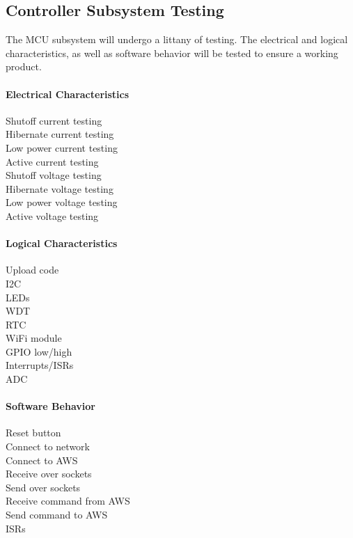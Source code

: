 \subsection{Controller Subsystem Testing}
\label{sec:controller_subsystem_testing}
The MCU subsystem will undergo a littany of testing. The electrical and
logical characteristics, as well as software behavior will be tested to ensure
a working product.

\paragraph{Electrical Characteristics}
Shutoff current testing \\
Hibernate current testing \\
Low power current testing \\
Active current testing \\
Shutoff voltage testing \\
Hibernate voltage testing \\
Low power voltage testing \\
Active voltage testing \\

\paragraph{Logical Characteristics}
Upload code \\
I2C \\
LEDs \\
WDT \\
RTC \\
WiFi module \\
GPIO low/high \\
Interrupts/ISRs \\
ADC \\

\paragraph{Software Behavior}
Reset button \\
Connect to network \\
Connect to AWS \\
Receive over sockets \\
Send over sockets \\
Receive command from AWS \\
Send command to AWS \\
ISRs \\
